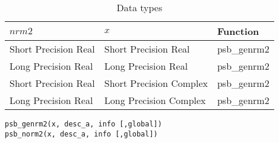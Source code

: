 \begin{table}[h]
\begin{center}
\begin{tabular}{lll}
\hline
$nrm2$ & $x$ & {\bf Function}\\
\hline
Short Precision Real&Short Precision Real & psb\_genrm2 \\
Long Precision Real&Long Precision Real & psb\_genrm2 \\
Short Precision Real&Short Precision Complex & psb\_genrm2 \\
Long Precision Real&Long Precision Complex & psb\_genrm2 \\
\hline
\end{tabular}
\end{center}
\caption{Data types\label{tab:f90nrm2}}
\end{table}

\begin{verbatim}
psb_genrm2(x, desc_a, info [,global])
psb_norm2(x, desc_a, info [,global])
\end{verbatim}

